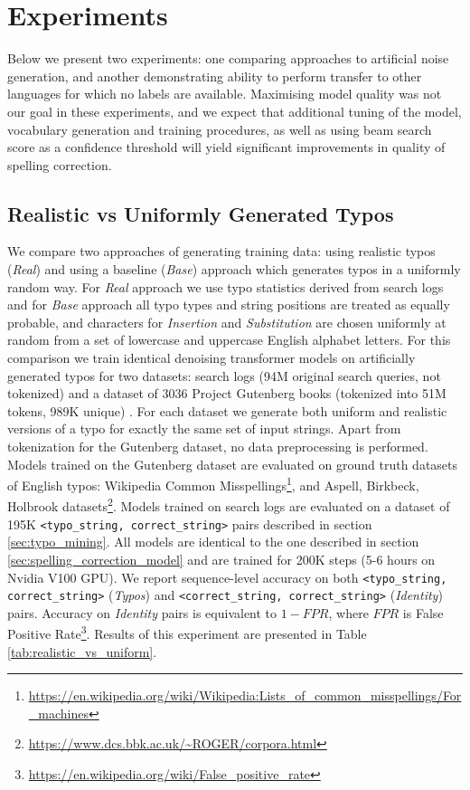 \documentclass[11pt,a4paper]{article}
\begin{document}
\section{Experiments}
Below we present two experiments: one comparing approaches to artificial noise generation, and another demonstrating ability to perform transfer to other languages for which no labels are available. 
Maximising model quality was not our goal in these experiments, and we expect that additional tuning of the model, vocabulary generation and training procedures, as well as using beam search score as a confidence threshold will yield significant improvements in quality of spelling correction.
\subsection{Realistic vs Uniformly Generated Typos}
\label{sec:real_vs_uni}
We compare two approaches of generating training data: using realistic typos (\textit{Real}) and using a baseline (\textit{Base}) approach which generates typos in a uniformly random way. For \textit{Real} approach we use typo statistics derived from search logs and for \textit{Base} approach all typo types and string positions are treated as equally probable, and characters for \textit{Insertion} and \textit{Substitution} are chosen uniformly at random from a set of lowercase and uppercase English alphabet letters. For this comparison we train identical denoising transformer models on artificially generated typos for two datasets: {\fi} search logs (94M original search queries, not tokenized) and a dataset of 3036 Project Gutenberg books (tokenized into 51M tokens, 989K unique) \cite{lahiri:2014:SRW}. For each dataset we generate both uniform and realistic versions of a typo for exactly the same set of input strings. Apart from tokenization for the Gutenberg dataset, no data preprocessing is performed. Models trained on the Gutenberg dataset are evaluated on ground truth datasets of English typos: Wikipedia Common Misspellings\footnote{\url{https://en.wikipedia.org/wiki/Wikipedia:Lists_of_common_misspellings/For_machines}},  and Aspell, Birkbeck, Holbrook datasets\footnote{\url{https://www.dcs.bbk.ac.uk/~ROGER/corpora.html}}. Models trained on {\fi} search logs are evaluated on a dataset of 195K \texttt{<typo\_string, correct\_string>} pairs described in section \cref{sec:typo_mining}. All models are identical to the one described in section \cref{sec:spelling_correction_model} and are trained for 200K steps (5-6 hours on Nvidia V100 GPU). We report sequence-level accuracy on both \texttt{<typo\_string, correct\_string>} (\textit{Typos}) and \texttt{<correct\_string, correct\_string>} (\textit{Identity}) pairs. Accuracy on \textit{Identity} pairs is equivalent to ${1-FPR}$, where $FPR$ is False Positive Rate\footnote{\url{https://en.wikipedia.org/wiki/False_positive_rate}}. Results of this experiment are presented in Table \ref{tab:realistic_vs_uniform}.
\end{document}
